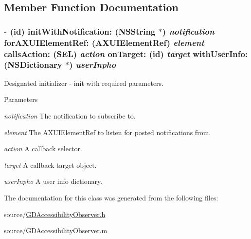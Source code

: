 \subsection{Member Function Documentation}
\hypertarget{interface_g_d_accessibility_observer_a38b7e5cbcdd5a9d4ff0e61fef5fede37}{
\subsubsection[{initWithNotification:forAXUIElementRef:callsAction:onTarget:withUserInfo:}]{\setlength{\rightskip}{0pt plus 5cm}-\/ (id) initWithNotification: (NSString $\ast$) {\em notification}\/ forAXUIElementRef: (AXUIElementRef) {\em element}\/ callsAction: (SEL) {\em action}\/ onTarget: (id) {\em target}\/ withUserInfo: (NSDictionary $\ast$) {\em userInpho}}}
\label{interface_g_d_accessibility_observer_a38b7e5cbcdd5a9d4ff0e61fef5fede37}


Designated initializer -\/ init with required parameters. 
\begin{DoxyParams}{Parameters}
\item[{\em notification}]The notification to subscribe to. \item[{\em element}]The AXUIElementRef to listen for posted notifications from. \item[{\em action}]A callback selector. \item[{\em target}]A callback target object. \item[{\em userInpho}]A user info dictionary. \end{DoxyParams}


The documentation for this class was generated from the following files:\begin{DoxyCompactItemize}
\item 
source/\hyperlink{_g_d_accessibility_observer_8h}{GDAccessibilityObserver.h}\item 
source/GDAccessibilityObserver.m\end{DoxyCompactItemize}
